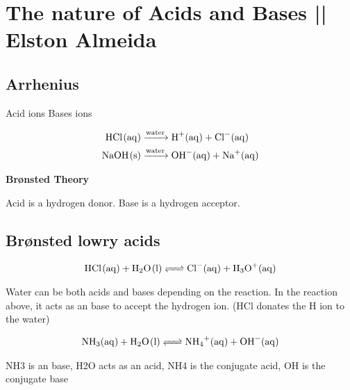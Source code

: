 \documentclass{article}
\begin{document}
\setcounter{section}{7}
\section{The nature of Acids and Bases \tiny{ || Elston Almeida}}

\subsection{Arrhenius}


\noindent
\begin{center}

  Acid  ions \hspace{5pc} Bases  ions

\begin{align*}
  \ce{ HCl(aq) &->[water] H+(aq) + Cl-(aq)}\\
  \ce{ NaOH(s) &->[water] OH-(aq) + Na+(aq)}
\end{align*}

\end{center}

\textbf{Br{\o}nsted Theory}
\\
\begin{center}
  Acid is a hydrogen donor.
  Base is a hydrogen acceptor.
\end{center}
  \subsection{Br{\o}nsted lowry acids}
\begin{center}
  \begin{align*}
  \ce{HCl(aq) + H2O(l) <=> Cl-(aq) + H3O+(aq)}
  \end{align*}
\end{center}

Water can be both acids and bases depending on the reaction. In the reaction above, it acts as an base to accept the hydrogen ion. (HCl donates the H ion to the water)

\vspace{-1pc}
\begin{center}
  
  \begin{align*}
    \ce{ NH3(aq) + H2O(l) <=> NH4+(aq) + OH-(aq)}
  \end{align*}

\end{center}

NH3 is an base, H2O acts as an acid, NH4 is the conjugate acid, OH is the conjugate base\\
\end{document}
